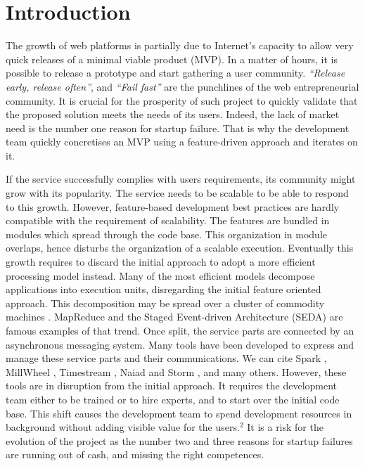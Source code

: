 \section{Introduction}

The growth of web platforms is partially due to Internet's capacity to allow very quick releases of a minimal viable product (MVP).
In a matter of hours, it is possible to release a prototype and start gathering a user community.
\textit{``Release early, release often''}, and \textit{``Fail fast''} are the punchlines of the web entrepreneurial community.
It is crucial for the prosperity of such project to quickly validate that the proposed solution meets the needs of its users.
Indeed, the lack of market need is the number one reason for startup failure.
That is why the development team quickly concretises an MVP using a feature-driven approach and iterates on it.

If the service successfully complies with users requirements, its community might grow with its popularity.
The service needs to be scalable to be able to respond to this growth.
However, feature-based development best practices are hardly compatible with the requirement of scalability.
The features are bundled in modules which spread through the code base.
This organization in module overlaps, hence disturbs the organization of a scalable execution.
Eventually this growth requires to discard the initial approach to adopt a more efficient processing model instead.
Many of the most efficient models decompose applications into execution units, disregarding the initial feature oriented approach.
This decomposition may be spread over a cluster of commodity machines \cite{Fox1997}.
MapReduce \cite{Dean2008} and the Staged Event-driven Architecture (SEDA) \cite{Welsh2000} are famous examples of that trend. %
Once split, the service parts are connected by an asynchronous messaging system.
Many tools have been developed to express and manage these service parts and their communications.
We can cite Spark \cite{Zaharia2010}, MillWheel \cite{Akidau2013}, Timestream \cite{Qian2013}, Naiad \cite{McSherry} and Storm \cite{Toshniwal2014}, and many others.
However, these tools are in disruption from the initial approach.
It requires the development team either to be trained or to hire experts, and to start over the initial code base.
This shift causes the development team to spend development resources in background without adding visible value for the users.$^2$
It is a risk for the evolution of the project as the number two and three reasons for startup failures are running out of cash, and missing the right competences.

